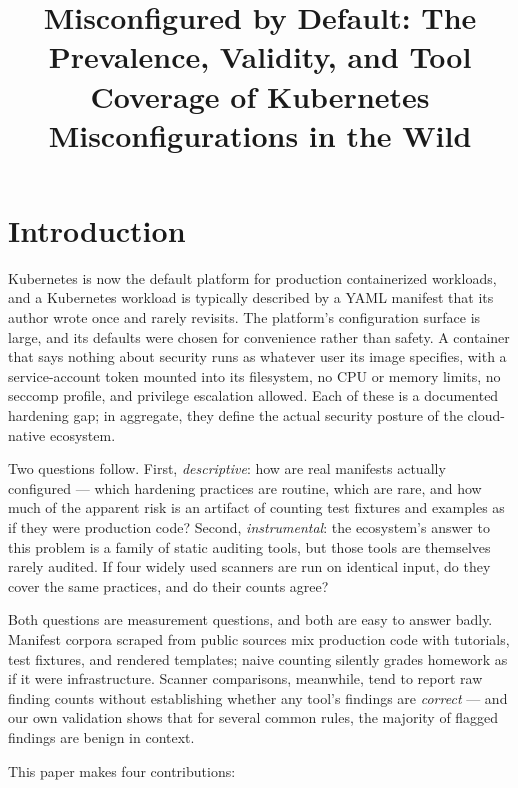 \documentclass[pdflatex,sn-basic]{sn-jnl}
\title[Misconfigured by Default]{Misconfigured by Default: The Prevalence, Validity, and Tool Coverage of Kubernetes Misconfigurations in the Wild}
\author*[1]{\fnm{Girish} \sur{Mallya}}\email{girishm60@gmail.com}
\affil*[1]{\orgname{Independent Researcher}, \orgaddress{\city{Bellevue}, \state{WA}, \country{USA}}}
\begin{document}
\maketitle

\hypertarget{introduction}{%
\section{Introduction}\label{introduction}}

Kubernetes is now the default platform for production containerized
workloads, and a Kubernetes workload is typically described by a YAML
manifest that its author wrote once and rarely revisits. The platform's configuration surface is
large, and its defaults were chosen for convenience rather than safety.
A container that says nothing about security runs as whatever user its
image specifies, with a service-account token mounted into its
filesystem, no CPU or memory limits, no seccomp profile, and privilege
escalation allowed. Each of these is a documented hardening gap; in
aggregate, they define the actual security posture of the cloud-native
ecosystem.

Two questions follow. First, \emph{descriptive}: how are real manifests
actually configured --- which hardening practices are routine, which are
rare, and how much of the apparent risk is an artifact of counting test
fixtures and examples as if they were production code? Second,
\emph{instrumental}: the ecosystem's answer to this problem is a family
of static auditing tools, but those tools are themselves rarely audited.
If four widely used scanners are run on identical input, do they cover
the same practices, and do their counts agree?

Both questions are measurement questions, and both are easy to answer
badly. Manifest corpora scraped from public sources mix production code
with tutorials, test fixtures, and rendered templates; naive counting
silently grades homework as if it were infrastructure. Scanner
comparisons, meanwhile, tend to report raw finding counts without
establishing whether any tool's findings are \emph{correct} --- and our
own validation shows that for several common rules, the majority of
flagged findings are benign in context.

This paper makes four contributions:
\end{document}

